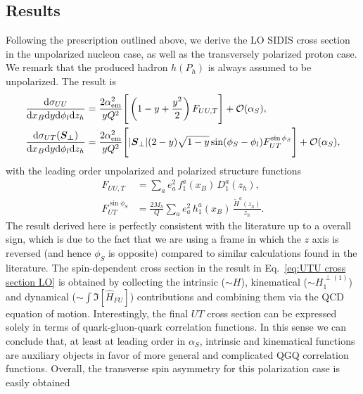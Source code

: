 \subsection{Results}
Following the prescription outlined above, we derive the LO SIDIS cross section in the unpolarized nucleon case, as well as the transversely polarized proton case. We remark that the produced hadron $h(P_h)$ is always assumed to be unpolarized. The result is
\begin{equation}\label{eq:UTU cross section LO}
    \begin{aligned}
        \frac{\dd \sigma_{UU}}{\dd x_B \dd y \dd \phi_l \dd z_h}&=  \frac{2 \alpha_{\rm em}^2}{y  Q^2}  \Bigg[\left(1-y+\frac{y^2}{2}\right)F_{UU,T}\Bigg]+\mathcal{O}(\alpha_S),\\
        \frac{\dd \sigma_{UT}(\boldsymbol{S_\perp})}{\dd x_B \dd y \dd \phi_l \dd z_h}&=\frac{2 \alpha_{\rm em}^2}{y  Q^2}\Bigg[ |\boldsymbol{S}_\perp|(2-y)\sqrt{1-y}\sin(\phi_S-\phi_l)F_{UT}^{\sin\phi_S}\Bigg]+\mathcal{O}(\alpha_S),
    \end{aligned}
\end{equation}
with the leading order unpolarized and polarized structure functions
\begin{equation}
    \begin{aligned}
        F_{UU,T}&= \sum_a e_a^2\, f_1^a(x_B)\, D_1^a(z_h),\\
        F_{UT}^{\sin\phi_S}&=\frac{2 M_h}{Q}\sum_a e_a^2 \,h_1^a(x_B)\, \frac{\tilde{H}^a(z_h)}{z_h}.
    \end{aligned}
\end{equation}
The result derived here is perfectly consistent with the literature \cite{mulders_complete_1996, bacchetta_semi-inclusive_2007} up to a overall sign, which is due to the fact that we are using a frame in which the $z$ axis is reversed (and hence $\phi_S$ is opposite) compared to similar calculations found in the literature. The spin-dependent cross section in the result in Eq.~\ref{eq:UTU cross section LO} is obtained by collecting the intrinsic ($\sim H$), kinematical ($\sim H_1^{\perp(1)}$) and dynamical ($\sim \int\Im[\hat H_{FU}]$) contributions and combining them via the QCD equation of motion. Interestingly, the final $UT$ cross section can be expressed solely in terms of quark-gluon-quark correlation functions. In this sense we can conclude that, at least at leading order in $\alpha_S$, intrinsic and kinematical functions are auxiliary objects in favor of more general and complicated QGQ correlation functions. Overall, the transverse spin asymmetry for this polarization case is easily obtained 
